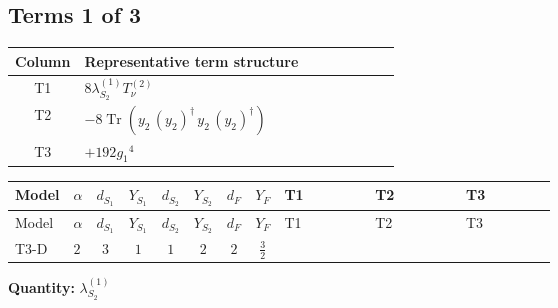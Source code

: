 \documentclass[8pt]{article}
\begin{document}
\begin{landscape}
\subsection*{Terms 1 of 3}
\begin{center}
\begin{tabular}{@{}c >{\raggedright\arraybackslash}p{0.82\linewidth}@{}}
\toprule
Column & Representative term structure \\
\midrule
T1 & \(\displaystyle 8 {\lambda_{S_2}^{(1)}} T_{\nu}^{(2)}\) \\
\midrule
T2 & \(\displaystyle -8 \operatorname{Tr}\!\left({y_2}\,\left({y_2}\right)^{\dagger}\,{y_2}\,\left({y_2}\right)^{\dagger}\right)\) \\
\midrule
T3 & \(\displaystyle +192 {g_1}^4\) \\
\midrule
\bottomrule
\end{tabular}
\end{center}
\smallskip
\tiny
\begin{longtable}{@{}llcccccc >{\raggedright\arraybackslash}p{0.21\linewidth} >{\raggedright\arraybackslash}p{0.21\linewidth} >{\raggedright\arraybackslash}p{0.21\linewidth}@{}}
\toprule
Model & $\alpha$ & $d_{S_1}$ & $Y_{S_1}$ & $d_{S_2}$ & $Y_{S_2}$ & $d_F$ & $Y_F$ & T1 & T2 & T3 \\
\midrule
\endfirsthead
\toprule
Model & $\alpha$ & $d_{S_1}$ & $Y_{S_1}$ & $d_{S_2}$ & $Y_{S_2}$ & $d_F$ & $Y_F$ & T1 & T2 & T3 \\
\midrule
\endhead
T3-D & $2$ & $3$ & $1$ & $1$ & $2$ & $2$ & $\frac{3}{2}$ & \scriptsize\adjustbox{max width=\linewidth}{$\begin{gathered} 8 {\lambda_{S_2}^{(1)}} T_{\nu}^{(2)}\end{gathered}$} & \scriptsize\adjustbox{max width=\linewidth}{$\begin{gathered} -8 \operatorname{Tr}\!\left({y_2}\,\left({y_2}\right)^{\dagger}\,{y_2}\,\left({y_2}\right)^{\dagger}\right)\end{gathered}$} & \scriptsize\adjustbox{max width=\linewidth}{$\begin{gathered} +192 {g_1}^4\end{gathered}$} \\
\midrule
\bottomrule
\end{longtable}
\clearpage
\noindent\textbf{Quantity: }$\lambda_{S_2}^{(1)}$\par\smallskip

\end{landscape}
\end{document}
